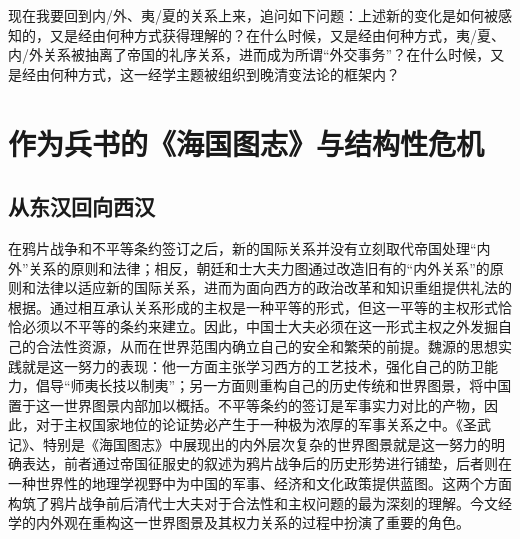 \documentclass[a4paper, 12pt, openright]{ctexbook}
\begin{document}
现在我要回到内/外、夷/夏的关系上来，追问如下问题：上述新的变化是如何被感知的，又是经由何种方式获得理解的？在什么时候，又是经由何种方式，夷/夏、内/外关系被抽离了帝国的礼序关系，进而成为所谓“外交事务”？在什么时候，又是经由何种方式，这一经学主题被组织到晚清变法论的框架内？

\section{作为兵书的《海国图志》与结构性危机}

\subsection{从东汉回向西汉}

在鸦片战争和不平等条约签订之后，新的国际关系并没有立刻取代帝国处理“内外”关系的原则和法律；相反，朝廷和士大夫力图通过改造旧有的“内外关系”的原则和法律以适应新的国际关系，进而为面向西方的政治改革和知识重组提供礼法的根据。通过相互承认关系形成的主权是一种平等的形式，但这一平等的主权形式恰恰必须以不平等的条约来建立。因此，中国士大夫必须在这一形式主权之外发掘自己的合法性资源，从而在世界范围内确立自己的安全和繁荣的前提。魏源的思想实践就是这一努力的表现：他一方面主张学习西方的工艺技术，强化自己的防卫能力，倡导“师夷长技以制夷”；另一方面则重构自己的历史传统和世界图景，将中国置于这一世界图景内部加以概括。不平等条约的签订是军事实力对比的产物，因此，对于主权国家地位的论证势必产生于一种极为浓厚的军事关系之中。《圣武记》、特别是《海国图志》中展现出的内外层次复杂的世界图景就是这一努力的明确表达，前者通过帝国征服史的叙述为鸦片战争后的历史形势进行铺垫，后者则在一种世界性的地理学视野中为中国的军事、经济和文化政策提供蓝图。这两个方面构筑了鸦片战争前后清代士大夫对于合法性和主权问题的最为深刻的理解。今文经学的内外观在重构这一世界图景及其权力关系的过程中扮演了重要的角色。
\end{document}
